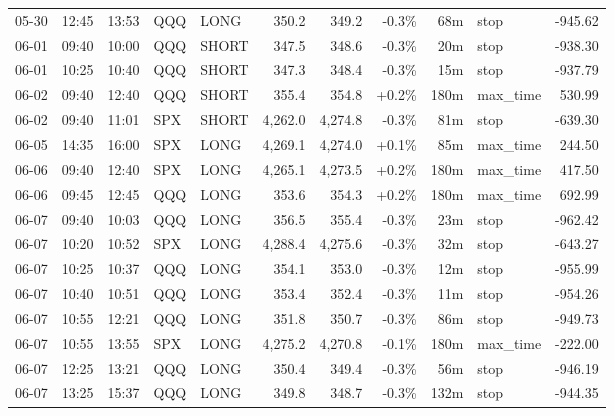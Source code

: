 \documentclass[11pt,a4paper,twoside]{article}
\begin{document}
\begin{center}
\begin{longtable}{>{\color{txtmain}}l l l l l r r r r >{\color{txtmain}}l r}
05-30 & 12:45 & 13:53 & QQQ & LONG & 350.2 & 349.2 & \textcolor{lossred}{-0.3\%} & 68m & stop & \textcolor{lossred}{-945.62} \\
06-01 & 09:40 & 10:00 & QQQ & SHORT & 347.5 & 348.6 & \textcolor{lossred}{-0.3\%} & 20m & stop & \textcolor{lossred}{-938.30} \\
06-01 & 10:25 & 10:40 & QQQ & SHORT & 347.3 & 348.4 & \textcolor{lossred}{-0.3\%} & 15m & stop & \textcolor{lossred}{-937.79} \\
06-02 & 09:40 & 12:40 & QQQ & SHORT & 355.4 & 354.8 & \textcolor{wingreen}{+0.2\%} & 180m & max\_time & \textcolor{wingreen}{530.99} \\
06-02 & 09:40 & 11:01 & SPX & SHORT & 4,262.0 & 4,274.8 & \textcolor{lossred}{-0.3\%} & 81m & stop & \textcolor{lossred}{-639.30} \\
06-05 & 14:35 & 16:00 & SPX & LONG & 4,269.1 & 4,274.0 & \textcolor{wingreen}{+0.1\%} & 85m & max\_time & \textcolor{wingreen}{244.50} \\
06-06 & 09:40 & 12:40 & SPX & LONG & 4,265.1 & 4,273.5 & \textcolor{wingreen}{+0.2\%} & 180m & max\_time & \textcolor{wingreen}{417.50} \\
06-06 & 09:45 & 12:45 & QQQ & LONG & 353.6 & 354.3 & \textcolor{wingreen}{+0.2\%} & 180m & max\_time & \textcolor{wingreen}{692.99} \\
06-07 & 09:40 & 10:03 & QQQ & LONG & 356.5 & 355.4 & \textcolor{lossred}{-0.3\%} & 23m & stop & \textcolor{lossred}{-962.42} \\
06-07 & 10:20 & 10:52 & SPX & LONG & 4,288.4 & 4,275.6 & \textcolor{lossred}{-0.3\%} & 32m & stop & \textcolor{lossred}{-643.27} \\
06-07 & 10:25 & 10:37 & QQQ & LONG & 354.1 & 353.0 & \textcolor{lossred}{-0.3\%} & 12m & stop & \textcolor{lossred}{-955.99} \\
06-07 & 10:40 & 10:51 & QQQ & LONG & 353.4 & 352.4 & \textcolor{lossred}{-0.3\%} & 11m & stop & \textcolor{lossred}{-954.26} \\
06-07 & 10:55 & 12:21 & QQQ & LONG & 351.8 & 350.7 & \textcolor{lossred}{-0.3\%} & 86m & stop & \textcolor{lossred}{-949.73} \\
06-07 & 10:55 & 13:55 & SPX & LONG & 4,275.2 & 4,270.8 & \textcolor{lossred}{-0.1\%} & 180m & max\_time & \textcolor{lossred}{-222.00} \\
06-07 & 12:25 & 13:21 & QQQ & LONG & 350.4 & 349.4 & \textcolor{lossred}{-0.3\%} & 56m & stop & \textcolor{lossred}{-946.19} \\
06-07 & 13:25 & 15:37 & QQQ & LONG & 349.8 & 348.7 & \textcolor{lossred}{-0.3\%} & 132m & stop & \textcolor{lossred}{-944.35} \\

\end{longtable}
\end{center}
\end{document}
